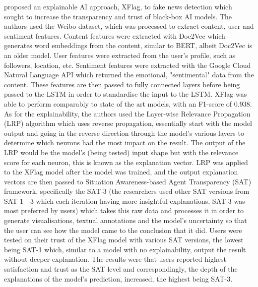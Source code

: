 \documentclass[stu,12pt,floatsintext,donotrepeattitle]{apa7}
\begin{document}
\textcite{Xflag} proposed an explainable AI approach, XFlag, to fake news detection which sought to increase the transparency and trust of black-box AI models. The authors used the Weibo dataset, which was processed to extract content, user and sentiment features. Content features were extracted with Doc2Vec which generates word embeddings from the content, similar to BERT, albeit Doc2Vec is an older model. User features were extracted from the user's profile, such as followers, location, etc. Sentiment features were extracted with the Google Cloud Natural Language API which returned the emotional, "sentimental" data from the content. These features are then passed to fully connected layers before being passed to the LSTM in order to standardise the input to the LSTM. XFlag was able to perform comparably to state of the art models, with an F1-score of 0.938. As for the explainability, the authors used the Layer-wise Relevance Propagation (LRP) algorithm which uses reverse propagation, essentially start with the model output and going in the reverse direction through the model's various layers to determine which neurons had the most impact on the result. The output of the LRP would be the model's (being tested) input shape but with the relevance score for each neuron, this is known as the explanation vector. LRP was applied to the XFlag model after the model was trained, and the output explanation vectors are then passed to Situation Awareness-based Agent Transparency (SAT) framework, specifically the SAT-3 (the researchers used other SAT versions from SAT 1 - 3 which each iteration having more insightful explanations, SAT-3 was most preferred by users) which takes this raw data and processes it in order to generate visualisations, textual annotations and the model's uncertainty so that the user can see how the model came to the conclusion that it did. Users were tested on their trust of the XFlag model with various SAT versions, the lowest being SAT-1 which, similar to a model with no explainability, output the result without deeper explanation. The results were that users reported highest satisfaction and trust as the SAT level and correspondingly, the depth of the explanations of the model's prediction, increased, the highest being SAT-3. 
\end{document}
